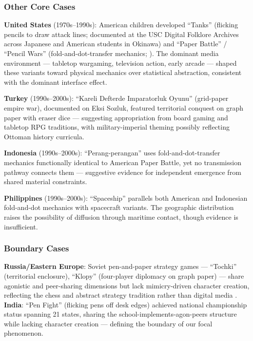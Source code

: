 \documentclass[12pt]{article}
\begin{document}
\subsubsection{Other Core Cases}

\textbf{United States} (1970s--1990s): American children developed ``Tanks'' (flicking pencils to draw attack lines; documented at the USC Digital Folklore Archives~\citep{uscfolklore} across Japanese and American students in Okinawa) and ``Paper Battle'' / ``Pencil Wars'' (fold-and-dot-transfer mechanics; \citealp{instructables}). The dominant media environment --- tabletop wargaming, television action, early arcade --- shaped these variants toward physical mechanics over statistical abstraction, consistent with the dominant interface effect.

\textbf{Turkey} (1990s--2000s): ``Kareli Defterde Imparatorluk Oyunu'' (grid-paper empire war), documented on Eksi Sozluk, featured territorial conquest on graph paper with eraser dice --- suggesting appropriation from board gaming and tabletop RPG traditions, with military-imperial theming possibly reflecting Ottoman history curricula.

\textbf{Indonesia} (1990s--2000s): ``Perang-perangan'' uses fold-and-dot-transfer mechanics functionally identical to American Paper Battle, yet no transmission pathway connects them --- suggestive evidence for independent emergence from shared material constraints.

\textbf{Philippines} (1990s--2000s): ``Spaceship'' parallels both American and Indonesian fold-and-dot mechanics with spacecraft variants. The geographic distribution raises the possibility of diffusion through maritime contact, though evidence is insufficient.

\subsubsection{Boundary Cases}

\textbf{Russia/Eastern Europe}: Soviet pen-and-paper strategy games --- ``Tochki'' (territorial enclosure), ``Klopy'' (four-player diplomacy on graph paper) --- share agonistic and peer-sharing dimensions but lack mimicry-driven character creation, reflecting the chess and abstract strategy tradition rather than digital media \citep{hackernews2017}. \textbf{India}: ``Pen Fight'' (flicking pens off desk edges) achieved national championship status spanning 21 states, sharing the school-implements-agon-peers structure while lacking character creation --- defining the boundary of our focal phenomenon.
\end{document}
